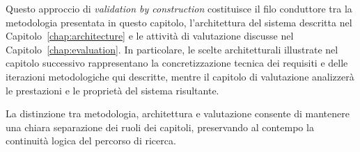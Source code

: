 Questo approccio di \emph{validation by construction} costituisce il filo conduttore tra la metodologia presentata in questo capitolo, l’architettura del sistema descritta nel Capitolo~\ref{chap:architecture} e le attività di valutazione discusse nel Capitolo~\ref{chap:evaluation}.
In particolare, le scelte architetturali illustrate nel capitolo successivo rappresentano la concretizzazione tecnica dei requisiti e delle iterazioni metodologiche qui descritte, mentre il capitolo di valutazione analizzerà le prestazioni e le proprietà del sistema risultante.

La distinzione tra metodologia, architettura e valutazione consente di mantenere una chiara separazione dei ruoli dei capitoli, preservando al contempo la continuità logica del percorso di ricerca.